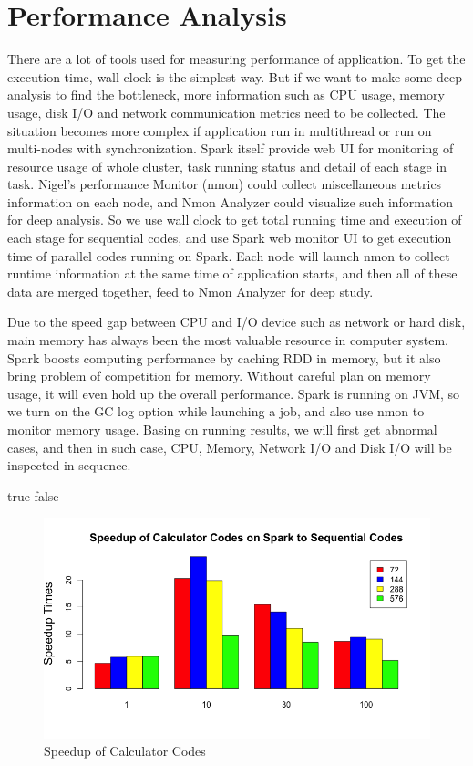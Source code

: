 \section{Performance Analysis}
There are a lot of tools used for measuring performance of application. To get the execution time, wall clock is the simplest way. But if we want to make some deep analysis to find the bottleneck, more information such as CPU usage, memory usage, disk I/O and network communication metrics need to be collected. The situation becomes more complex if application run in multithread or run on multi-nodes with synchronization. Spark itself provide web UI for monitoring of resource usage of whole cluster, task running status and detail of each stage in task. Nigel's performance Monitor (nmon) could collect miscellaneous metrics information on each node, and Nmon Analyzer could visualize such information for deep analysis. So we use wall clock to get total running time and execution of each stage for sequential codes, and use Spark web monitor UI to get execution time of parallel codes running on Spark. Each node will launch nmon to collect runtime information at the same time of application starts, and then all of these data are merged together, feed to Nmon Analyzer for deep study. 

Due to the speed gap between CPU and I/O device such as network or hard disk, main memory has always been the most valuable resource in computer system. Spark boosts computing performance by caching  RDD in memory, but it also bring problem of competition for memory. Without careful plan on memory usage, it will even hold up the overall performance. Spark is running on JVM, so we turn on the GC log option while launching a job, and also use nmon to monitor memory usage. Basing on running results, we will first get abnormal cases, and then in such case, CPU, Memory, Network I/O and Disk I/O will be inspected in sequence.  

\ifx true false
\begin{figure}[!ht]
\centering
\includegraphics[scale=.60]{figures/CalcSpeedup.png}
\caption{Speedup of Calculator Codes}
\label{CalcSpeedup}
\end{figure}
\fi 


